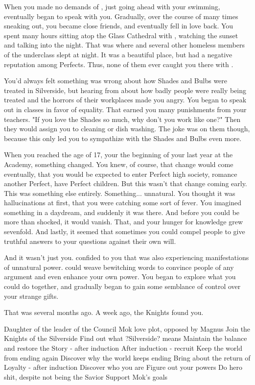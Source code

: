 \documentclass[char]{Silversiders}
\begin{document}
When you made no demands of \cWisdom{\them}, just going ahead with your swimming, eventually \cWisdom{} began to speak with you. Gradually, over the course of many times sneaking out, you became close friends, and eventually \cWisdom{\they} fell in love back. You spent many hours sitting atop the Glass Cathedral with \cWisdom{\them}, watching the sunset and talking into the night. That was where \cWisdom{\they} and several other homeless members of the underclass slept at night. It was a beautiful place, but had a negative reputation among Perfects. Thus, none of them ever caught you there with \cWisdom{}.

You'd always felt something was wrong about how Shades and Bulbs were treated in Silverside, but hearing from \cWisdom{} about how badly people were really being treated and the horrors of their workplaces made you angry. You began to speak out in classes in favor of equality. That earned you many punishments from your teachers. "If you love the Shades so much, why don't you work like one?" Then they would assign you to cleaning or dish washing. The joke was on them though, because this only led you to sympathize with the Shades and Bulbs even more.

When you reached the age of 17, your the beginning of your last year at the Academy, something changed. You knew, of course, that change would come eventually, that you would be expected to enter Perfect high society, romance another Perfect, have Perfect children. But this wasn't that change coming early. This was something else entirely. Something... unnatural. You thought it was hallucinations at first, that you were catching some sort of fever. You imagined something in a daydream, and suddenly it was there. And before you could be more than shocked, it would vanish. That, and your hunger for knowledge grew sevenfold. And lastly, it seemed that sometimes you could compel people to give truthful answers to your questions against their own will.

And it wasn't just you. \cWisdom{} confided to you that \cWisdom{\they} was also experiencing manifestations of unnatural power. \cWisdom{\They} could weave bewitching words to convince people of any argument and even enhance your own power. You began to explore what you could do together, and gradually began to gain some semblance of control over your strange gifts. 

That was several months ago. A week ago, the Knights found you.

Daughter of the leader of the Council
Mok love plot, opposed by Magnus
Join the Knights of the Silverside
Find out what ?Silverside? means
Maintain the balance and restore the Story - after induction
After induction - recruit
Keep the world from ending again
Discover why the world keeps ending
Bring about the return of Loyalty - after induction
Discover who you are
Figure out your powers
Do hero shit, despite not being the Savior
Support Mok's goals
\end{document}
